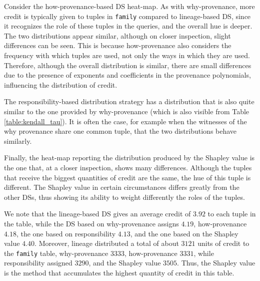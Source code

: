 \documentclass[preprint,12pt,sort&compress]{elsarticle}
\newcommand{\rtwo}[1]{\textcolor{reviewer2}{#1}}
\newcommand{\scream}[1]{{\bf * #1 *}{\typeout{#1}}}
\begin{document}
Consider the how-provenance-based DS heat-map. %
As with why-provenance, more credit is typically given to tuples in \texttt{family} compared to lineage-based DS, since it recognizes the role of these tuples in the queries, and the overall hue is deeper.  
The two distributions appear similar, although on closer inspection, slight differences can be seen. 
This is because how-provenance also considers the frequency with which tuples are used, not only the ways in which they are used. Therefore, although the overall distribution is similar, there are small differences due to the presence of exponents and coefficients in the provenance polynomials, influencing the distribution of credit. 

\rtwo{The responsibility-based distribution strategy has a distribution that is also quite similar to the one provided by why-provenance (which is also visible from Table \ref{table:kendall_tau}). It is often the case, for example when the witnesses of the why provenance share one common tuple, that the two distributions behave similarly.} %

\rtwo{Finally, the heat-map reporting the distribution produced by the Shapley value is the one that, at a closer inspection, shows many differences. Although the tuples that receive the biggest quantities of credit are the same, the hue of this tuple is different. The Shapley value in certain circumstances differs greatly from the other DSs, thus showing its ability to weight differently the roles of the tuples.}

We note that the lineage-based DS gives an average credit of $3.92$ to each tuple in the table, while the DS based on why-provenance assigns $4.19$, how-provenance $4.18$, \rtwo{the one based on responsibility $4.13$, and the one based on the Shapley value $4.40$}. 
Moreover, lineage distributed a total of about $3121$ units of credit to the \texttt{family} table, why-provenance $3333$, how-provenance $3331$, while \rtwo{responsibility assigned $3290$, and the Shapley value $3505$. Thus, the Shapley value is the method that accumulates the highest quantity of credit in this table.} 
\end{document}
